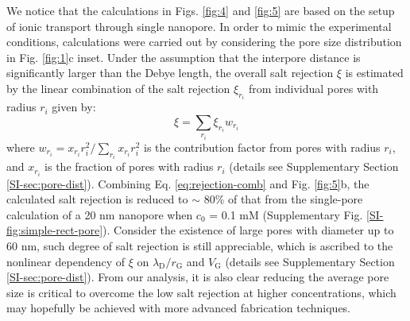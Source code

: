 \documentclass[journal=nalefd,email=true, hyperref=true, keywords=false]{achemso}
\newcommand{\Fig}{Fig.}
\begin{document}
{
We notice that the calculations in Figs. \ref{fig:4} and \ref{fig:5} 
are based on the setup  of ionic transport through single nanopore.
In order to mimic the experimental conditions, 
calculations were carried out by considering the pore size distribution in Fig. \ref{fig:1}c inset. 
Under the assumption that the interpore distance is significantly larger than the Debye length,
the overall salt rejection $\xi$ is
estimated by the linear combination of the salt rejection 
$\xi_{r_i}$ 
from individual pores with radius $r_i$ given by:
\begin{equation}
\label{eq:rejection-comb}
\xi = \sum_{r_{i}} \xi_{r_{i}} w_{r_{i}}
\end{equation}
where
$w_{r_{i}} = x_{r_{i}} r_{i}^{2} / \sum_{r_{i}} x_{r_{i}} r_{i}^{2} $
is the contribution factor from pores with radius $r_{i}$, and
$x_{r_{i}}$ is the fraction of pores with radius $r_{i}$ (details see
Supplementary Section \ref{SI-sec:pore-dist}). Combining
Eq. \ref{eq:rejection-comb} and \Fig{} \ref{fig:5}b, the calculated
salt rejection is reduced to $\sim{}$ 80\% of that from the
single-pore calculation of a 20 nm nanopore when $c_{0}$ = 0.1 mM
(Supplementary \Fig{} \ref{SI-fig:simple-rect-pore}). Consider the
existence of large pores with diameter up to 60 nm, such degree of
salt rejection is still appreciable, which is ascribed to the
nonlinear dependency of $\xi$ on
$\lambda_{\mathrm{D}} / r_{\mathrm{G}}$ and $V_{\mathrm{G}}$ (details
see Supplementary Section \ref{SI-sec:pore-dist}).}  From our
analysis, it is also clear reducing the average pore size is critical
to overcome the low salt rejection at higher concentrations, which may
hopefully be achieved with more advanced fabrication techniques.

\end{document}
